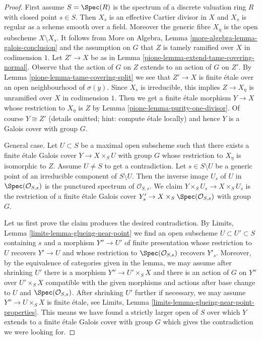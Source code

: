\begin{proof}

First assume $S = \Spec(R)$ is the spectrum of a discrete valuation ring $R$
with closed point $s \in S$. Then $X_s$ is an effective Cartier
divisor in $X$ and $X_s$ is regular as a scheme smooth over a field.
Moreover the generic fibre $X_\eta$ is the open subscheme $X \setminus X_s$.
It follows from
More on Algebra, Lemma \ref{more-algebra-lemma-galois-conclusion}
and the assumption on $G$ that $Z$ is tamely ramified
over $X$ in codimension $1$. Let $Z' \to X$ be as in
Lemma \ref{pione-lemma-extend-tame-covering-normal}. Observe that
the action of $G$ on $Z$ extends to an action of $G$ on $Z'$.
By Lemma \ref{pione-lemma-tame-covering-split}
we see that $Z' \to X$ is finite \'etale over an open
neighbourhood of $\sigma(y)$.
Since $X_s$ is irreducible, this implies $Z \to X_\eta$
is unramified over $X$ in codimension $1$.
Then we get a finite \'etale morphism $Y \to X$
whose restriction to $X_\eta$ is $Z$ by
Lemma \ref{pione-lemma-purity-one-divisor}.
Of course $Y \cong Z'$ (details omitted; hint: compute \'etale locally)
and hence $Y$ is a Galois cover with group $G$.

\medskip\noindent
General case. Let $U \subset S$ be a maximal open subscheme
such that there exists a finite \'etale Galois cover
$Y \to X \times_S U$ with group $G$
whose restriction to $X_\eta$ is isomorphic to $Z$.
Assume $U \not = S$ to get a contradiction.
Let $s \in S \setminus U$ be a generic point of an irreducible
component of $S \setminus U$. Then the inverse image $U_s$
of $U$ in $\Spec(\mathcal{O}_{S, s})$
is the punctured spectrum of $\mathcal{O}_{S, s}$.
We claim $Y \times_S U_s \to X \times_S U_s$
is the restriction of a finite \'etale Galois cover
$Y'_s \to X \times_S \Spec(\mathcal{O}_{S, s})$
with group $G$.

\medskip\noindent
Let us first prove the claim produces the desired contradiction.
By Limits, Lemma \ref{limits-lemma-glueing-near-point}
we find an open subscheme $U \subset U' \subset S$
containing $s$ and a morphism $Y'' \to U'$ of finite presentation
whose restriction to $U$ recovers $Y' \to U$ and
whose restriction to $\Spec(\mathcal{O}_{S, s})$ recovers $Y'_s$.
Moreover, by the equivalence of categories given in the
lemma, we may assume after shrinking $U'$
there is a morphism $Y'' \to U' \times_S X$
and there is an action of $G$ on $Y''$ over $U' \times_S X$
compatible with the given morphisms and actions after base
change to $U$ and $\Spec(\mathcal{O}_{S, s})$.
After shrinking $U'$ further if necessary, we may
assume $Y'' \to U \times_S X$ is finite \'etale, see
Limits, Lemma \ref{limits-lemma-glueing-near-point-properties}.
This means we have found a strictly larger open of $S$ over which
$Y$ extends to a finite \'etale Galois cover with group $G$
which gives the contradiction we were looking for.


\end{proof}
